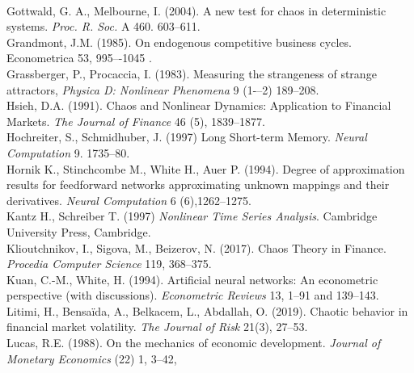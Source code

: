 \documentclass[12pt]{article}
\begin{document}
\newline{}\\
\noindent Gottwald, G. A., Melbourne, I. (2004). A new test for chaos in deterministic systems.
\emph{Proc. R. Soc.} A 460. 603--611.
\newline{}\\
\noindent Grandmont, J.M. (1985). On endogenous competitive business cycles. Econometrica 53, 995–-1045 .
\newline{}\\
\noindent Grassberger, P., Procaccia, I. (1983). Measuring the strangeness of strange attractors,
\emph{Physica D: Nonlinear Phenomena} 9 (1-–2) 189--208.
\newline{}\\
\noindent Hsieh, D.A. (1991). Chaos and Nonlinear Dynamics: Application to Financial Markets. \emph{The Journal of Finance} 46 (5), 1839--1877. 
\newline{}\\
\noindent Hochreiter, S., Schmidhuber, J. (1997)  Long Short-term Memory. \emph{Neural Computation} 9. 1735--80. 
\newline{}\\
\noindent Hornik K., Stinchcombe M., White H., Auer P. (1994).
Degree of approximation results for feedforward networks approximating unknown mappings and their derivatives.
\emph{Neural Computation} 6 (6),1262--1275.
\newline{}\\
\noindent Kantz H., Schreiber T. (1997)
\emph{Nonlinear Time Series Analysis}. Cambridge University Press, Cambridge. 
\newline{}\\
\noindent Klioutchnikov, I., Sigova, M., Beizerov, N. (2017). Chaos Theory in Finance. \emph{Procedia Computer Science} 119, 368--375.
\newline{}\\
\noindent Kuan, C.-M., White, H. (1994). Artificial neural networks: An econometric perspective
(with discussions). \emph{Econometric Reviews} 13, 1--91 and 139--143.
\newline{}\\
\noindent Litimi, H., Bensaïda, A., Belkacem, L., Abdallah, O. (2019). Chaotic behavior in financial market volatility.
\emph{The Journal of Risk} 21(3), 27--53.
\newline{}\\
\noindent Lucas, R.E. (1988). On the mechanics of economic development. \emph{Journal of Monetary Economics} (22) 1, 3--42,
\end{document}
